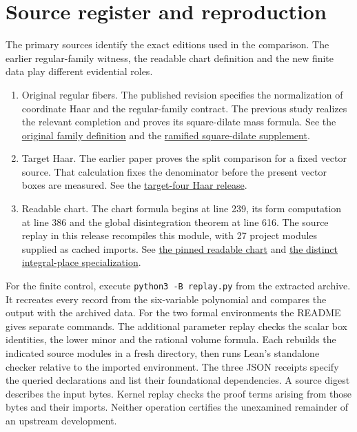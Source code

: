 \documentclass[12pt,letterpaper]{article}
\newcommand{\id}[1]{{\small\nolinkurl{#1}}}
\begin{document}
\section{Source register and reproduction}
The primary sources identify the exact editions used in the comparison. The earlier regular-family witness, the readable chart definition and the new finite data play different evidential roles.

\begin{enumerate}[leftmargin=1.5em]
\item Original regular fibers. The published revision specifies the normalization of coordinate Haar and the regular-family contract. The previous study realizes the relevant completion and proves its square-dilate mass formula. See the \href{https://github.com/nousentllc/riemann-hypothesis/blob/40e56bab026552e089d7afcfeff08d2defb9c005/src/Formalism/SharpRestriction/GlobalSchurBounds/GeneralLinearActions/GenusMassVolumes.lean}{original family definition} and the \href{https://github.com/nousentllc/riemann-hypothesis/tree/17263859a4d27c62cfc67571737355f61a080806/research/uriel/experiments/ramified-square-dilates}{ramified square-dilate supplement}.
\item Target Haar. The earlier paper proves the split comparison for a fixed vector source. That calculation fixes the denominator before the present vector boxes are measured. See the \href{https://github.com/nousentllc/riemann-hypothesis/tree/4be022986be0e29b4d38f9d04b17956131fe4d56/research/uriel/experiments/target-four-haar}{target-four Haar release}.
\item Readable chart. The chart formula begins at line 239, its form computation at line 386 and the global disintegration theorem at line 616. The source replay in this release recompiles this module, with 27 project modules supplied as cached imports. See \href{https://github.com/nousentllc/riemann-hypothesis/blob/e063a923620ee7787b4a1270421478645bf66bdb/src/Lib/General/Measure/QuadricDisintegration.lean#L239}{the pinned readable chart} and \href{https://github.com/nousentllc/riemann-hypothesis/blob/e063a923620ee7787b4a1270421478645bf66bdb/src/Lib/SiegelWeil/OneVector/FinitePlaceDensity.lean}{the distinct integral-place specialization}.
\end{enumerate}

For the finite control, execute \id{python3 -B replay.py} from the extracted archive. It recreates every record from the six-variable polynomial and compares the output with the archived data. For the two formal environments the README gives separate commands. The additional parameter replay checks the scalar box identities, the lower minor and the rational volume formula. Each rebuilds the indicated source modules in a fresh directory, then runs Lean's standalone checker relative to the imported environment. The three JSON receipts specify the queried declarations and list their foundational dependencies. A source digest describes the input bytes. Kernel replay checks the proof terms arising from those bytes and their imports. Neither operation certifies the unexamined remainder of an upstream development.
\end{document}
